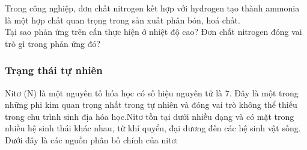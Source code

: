 
\begin{kd}
	Trong công nghiệp, đơn chất nitrogen kết hợp với hydrogen tạo thành ammonia là một hợp chất quan trọng trong sản xuất phân bón, hoá chất.\\
	Tại sao phản ứng trên cấn thực hiện ở nhiệt độ cao? Đơn chất nitrogen đóng vai trò gì trong phản ứng đó?
\end{kd}
\subsubsection{Trạng thái tự nhiên}
		Nitơ (N) là một nguyên tố hóa học có số hiệu nguyên tử là 7. Đây là một trong những phi kim quan trọng nhất trong tự nhiên và đóng vai trò không thể thiếu trong chu trình sinh địa hóa học.Nitơ tồn tại dưới nhiều dạng và có mặt trong nhiều hệ sinh thái khác nhau, từ khí quyển, đại dương đến các hệ sinh vật sống. Dưới đây là các nguồn phân bố chính của nitơ:
	\clearpage
